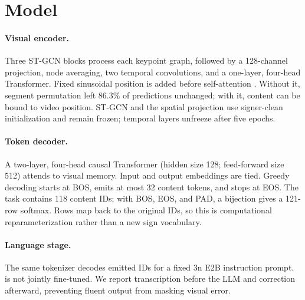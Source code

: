 \section{Model}

\paragraph{Visual encoder.}
Three ST-GCN blocks process each keypoint graph, followed by a 128-channel
projection, node averaging, two temporal convolutions, and a one-layer, four-head
Transformer.  Fixed sinusoidal position is added before self-attention
\citep{vaswani2017attention}.  Without it, segment permutation left 86.3\% of
predictions unchanged; with it, content can be bound to video position.  ST-GCN
and the spatial projection use signer-clean initialization and remain frozen;
temporal layers unfreeze after five epochs.

\paragraph{Token decoder.}
A two-layer, four-head causal Transformer (hidden size 128; feed-forward size 512)
attends to visual memory.  Input and output embeddings are tied.  Greedy decoding
starts at BOS, emits at most 32 content tokens, and stops at EOS.  The task contains
118 \Gemma{} content IDs; with BOS, EOS, and PAD, a bijection gives a 121-row
softmax.  Rows map back to the original IDs, so this is computational
reparameterization rather than a new sign vocabulary.

\paragraph{Language stage.}
The same tokenizer decodes emitted IDs for a fixed \Gemma{} 3n E2B instruction
prompt.  \Gemma{} is not jointly fine-tuned.  We report transcription before the
LLM and correction afterward, preventing fluent output from masking visual error.
